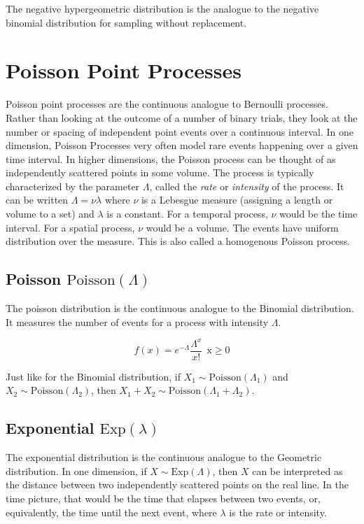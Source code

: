 The negative hypergeometric distribution is the analogue to the negative binomial distribution for sampling without replacement. 


\section{Poisson Point Processes}
Poisson point processes are the continuous analogue to Bernoulli processes. Rather than looking at the outcome of a number of binary trials, they look at the number or spacing of independent point events over a continuous interval. In one dimension, Poisson Processes very often model rare events happening over a given time interval. In higher dimensions, the Poisson process can be thought of as independently scattered points in some volume. The process is typically characterized by the parameter $\Lambda$, called the \textit{rate} or \textit{intensity} of the process. It can be written $\Lambda = \nu \lambda$ where $\nu$ is a Lebesgue measure (assigning a length or volume to a set) and $\lambda$ is a constant. For a temporal process, $\nu$ would be the time interval. For a spatial process, $\nu$ would be a volume. The events have uniform distribution over the measure. This is also called a homogenous Poisson process. 

\subsection{Poisson $\mathrm{Poisson}(\Lambda)$}
The poisson distribution is the continuous analogue to the Binomial distribution. It measures the number of events for a process with intensity $\Lambda$.

\begin{equation}
f(x) = e^{-\Lambda}\frac{\Lambda^x}{x!}\ \ \mathrm{x\geq0}
\end{equation}

Just like for the Binomial distribution, if $X_1 \sim \mathrm{Poisson}(\Lambda_1)$ and $X_2 \sim \mathrm{Poisson}(\Lambda_2)$, then $X_1 + X_2 \sim \mathrm{Poisson}(\Lambda_1 + \Lambda_2)$. 


\subsection{Exponential $\mathrm{Exp}(\lambda)$}
The exponential distribution is the continuous analogue to the Geometric distribution. In one dimension, if $X \sim \mathrm{Exp}(\Lambda)$, then $X$ can be interpreted as the distance between two independently scattered points on the real line. In the time picture, that would be the time that elapses between two events, or, equivalently, the time until the next event, where $\lambda$ is the rate or intensity.

